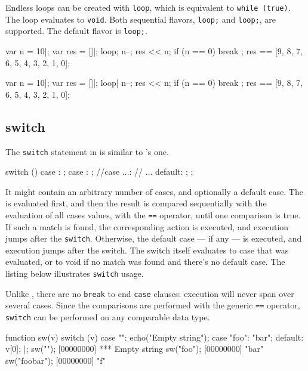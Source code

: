 Endless loops can be created with \lstinline|loop|, which is
equivalent to \lstinline|while (true)|.  The loop evaluates to
\lstinline|void|.  Both sequential flavors, \lstinline|loop;| and
\lstinline'loop;', are supported.  The default flavor is
\lstinline|loop;|.

\begin{urbiassert}
{
  var n = 10|;
  var res = []|;
  loop;
  {
    n--;
    res << n;
    if (n == 0)
      break
  };
  res
}
==
[9, 8, 7, 6, 5, 4, 3, 2, 1, 0];
\end{urbiassert}

\begin{urbiassert}
{
  var n = 10|;
  var res = []|;
  loop|
  {
    n--;
    res << n;
    if (n == 0)
      break
  };
  res
}
==
[9, 8, 7, 6, 5, 4, 3, 2, 1, 0];
\end{urbiassert}

\subsection{switch}

The \lstinline|switch| statement in \us is similar to \C's one.

\begin{urbiunchecked}
switch ()
{
  case :
    ;
  case :
    ;
//case ...:
//  ...
  default:
    ;
};
\end{urbiunchecked}

It might contain an arbitrary number of cases, and optionally a
default case. The  is evaluated first, and then the
result is compared sequentially with the evaluation of all cases
values, with the \lstinline|==| operator, until one comparison is
true. If such a match is found, the corresponding action is executed,
and execution jumps after the \lstinline|switch|. Otherwise, the
default case --- if any --- is executed, and execution jumps after the
switch. The switch itself evaluates to case that was evaluated, or to
void if no match was found and there's no default case. The listing below
illustrates \lstinline|switch| usage.

Unlike \C, there are no \lstinline|break| to end \lstinline|case|
clauses: execution will never span over several cases.  Since the
comparisons are performed with the generic \lstinline|==| operator,
\lstinline|switch| can be performed on any comparable data type.

\begin{urbiscript}
function sw(v)
{
  switch (v)
  {
    case "":
      echo("Empty string");
    case "foo":
      "bar";
    default:
      v[0];
  }
}|;
sw("");
[00000000] *** Empty string
sw("foo");
[00000000] "bar"
sw("foobar");
[00000000] "f"
\end{urbiscript}

